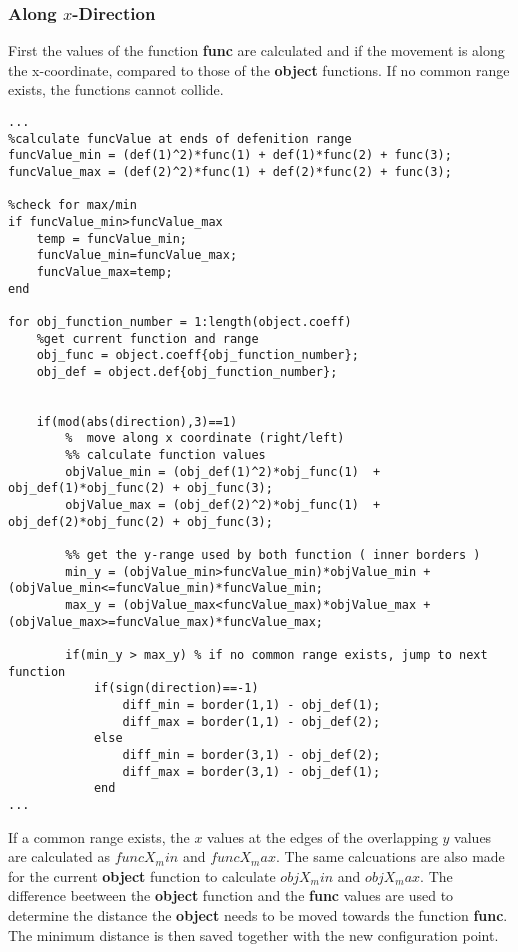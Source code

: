\subsubsection{Along $x$-Direction}
First the values of the function \textbf{func} are calculated and if the movement is along the x-coordinate, compared to those of the \textbf{object} functions. If no common range exists, the functions cannot collide.
\begin{lstlisting}
...
%calculate funcValue at ends of defenition range
funcValue_min = (def(1)^2)*func(1) + def(1)*func(2) + func(3);
funcValue_max = (def(2)^2)*func(1) + def(2)*func(2) + func(3);

%check for max/min
if funcValue_min>funcValue_max
    temp = funcValue_min;
    funcValue_min=funcValue_max;
    funcValue_max=temp;
end

for obj_function_number = 1:length(object.coeff)
    %get current function and range
    obj_func = object.coeff{obj_function_number};
    obj_def = object.def{obj_function_number};
    
 
    if(mod(abs(direction),3)==1)
        %  move along x coordinate (right/left)
        %% calculate function values
        objValue_min = (obj_def(1)^2)*obj_func(1)  + obj_def(1)*obj_func(2) + obj_func(3);
        objValue_max = (obj_def(2)^2)*obj_func(1)  + obj_def(2)*obj_func(2) + obj_func(3);
        
        %% get the y-range used by both function ( inner borders )
        min_y = (objValue_min>funcValue_min)*objValue_min + (objValue_min<=funcValue_min)*funcValue_min;
        max_y = (objValue_max<funcValue_max)*objValue_max + (objValue_max>=funcValue_max)*funcValue_max;
        
        if(min_y > max_y) % if no common range exists, jump to next function
            if(sign(direction)==-1)
                diff_min = border(1,1) - obj_def(1);
                diff_max = border(1,1) - obj_def(2);
            else
                diff_min = border(3,1) - obj_def(2);
                diff_max = border(3,1) - obj_def(1);
            end
...
\end{lstlisting}
 If a common range exists, the $x$ values at the edges of the overlapping $y$ values are calculated as $funcX_min$ and $funcX_max$.
The same calcuations are also made for the current \textbf{object} function to calculate $objX_min$ and $objX_max$. The difference beetween the \textbf{object} function and the \textbf{func} values are used to determine the distance the \textbf{object} needs to be moved towards the function \textbf{func}. The minimum distance is then saved together with the new configuration point.
